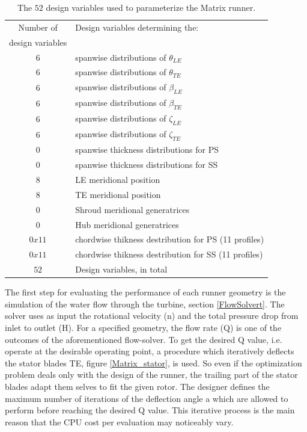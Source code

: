 \begin{table}[h!]
\begin{center}
\begin{tabular}{ |c|l| }
\hline

Number of              & Design variables determining the:\\
design variables       & \\
\hline
6 & spanwise distributions of $\theta_{LE}$\\
\hline
6 & spanwise distributions of $\theta_{TE}$\\
\hline
6 & spanwise distributions of $\beta_{LE}$\\
\hline
6 & spanwise distributions of $\beta_{TE}$\\
\hline
6 & spanwise distributions of $\zeta_{LE}$\\
\hline
6 & spanwise distributions of $\zeta_{TE}$\\
\hline
0 & spanwise thickness distributions for PS \\
\hline
0 & spanwise thickness distributions for SS\\
\hline
8 & LE meridional position\\
\hline
8 & TE meridional position\\
\hline
0 & Shroud meridional generatrices \\
\hline
0 & Hub meridional generatrices\\
\hline
$0 x 11$ & chordwise thikness destribution for PS (11 profiles)\\
\hline
$0 x 11$ & chordwise thikness destribution for SS (11 profiles)\\
\hline
\hline
$52$ & Design variables, in total \\
\hline   
\end{tabular}
\caption{
The $52$ design variables used to parameterize the Matrix runner.}
\label{design_vars2}
\end{center}
\end{table}

The first step for evaluating the performance of each runner geometry is the simulation of the water flow through the turbine, section \ref{FlowSolvert}. The solver uses as input the rotational velocity (n) and the total pressure drop from inlet to outlet (H). For a specified geometry, the flow rate (Q) is one of the outcomes of the aforementioned flow-solver. To get the desired Q value, i.e. operate at the desirable operating point, a procedure which iteratively deflects the stator blades TE, figure \ref{Matrix_stator}, is used. So even if the optimization problem deals only with the design of the runner, the trailing part of the stator blades adapt them selves to fit the given rotor. The designer defines the maximum number of iterations of the deflection angle a which are allowed to perform before reaching the desired Q value. This iterative process is the main reason that the CPU cost per evaluation may noticeably vary.



